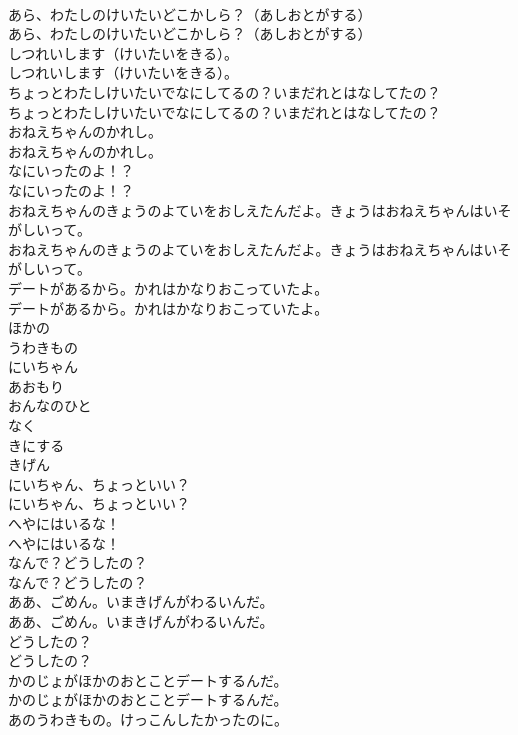 \documentclass[8pt]{extreport}
\begin{document}
\begin{CJK}{UTF8}{min}
\\	あら、わたしのけいたいどこかしら？（あしおとがする）	
\\	あら、わたしのけいたいどこかしら？（あしおとがする） 
\\	しつれいします（けいたいをきる）。	
\\	しつれいします（けいたいをきる）。 
\\	ちょっとわたしけいたいでなにしてるの？いまだれとはなしてたの？	
\\	ちょっとわたしけいたいでなにしてるの？いまだれとはなしてたの？ 
\\	おねえちゃんのかれし。	
\\	おねえちゃんのかれし。 
\\	なにいったのよ！？	
\\	なにいったのよ！？ 
\\	おねえちゃんのきょうのよていをおしえたんだよ。きょうはおねえちゃんはいそがしいって。	
\\	おねえちゃんのきょうのよていをおしえたんだよ。きょうはおねえちゃんはいそがしいって。 
\\	デートがあるから。かれはかなりおこっていたよ。	
\\	デートがあるから。かれはかなりおこっていたよ。 
\\	ほかの
\\	うわきもの
\\	にいちゃん
\\	あおもり
\\	おんなのひと
\\	なく
\\	きにする
\\	きげん
\\	にいちゃん、ちょっといい？	
\\	にいちゃん、ちょっといい？ 
\\	へやにはいるな！	
\\	へやにはいるな！ 
\\	なんで？どうしたの？	
\\	なんで？どうしたの？ 
\\	ああ、ごめん。いまきげんがわるいんだ。	
\\	ああ、ごめん。いまきげんがわるいんだ。 
\\	どうしたの？	
\\	どうしたの？ 
\\	かのじょがほかのおとことデートするんだ。	
\\	かのじょがほかのおとことデートするんだ。 
\\	あのうわきもの。けっこんしたかったのに。	

\end{CJK}
\end{document}
